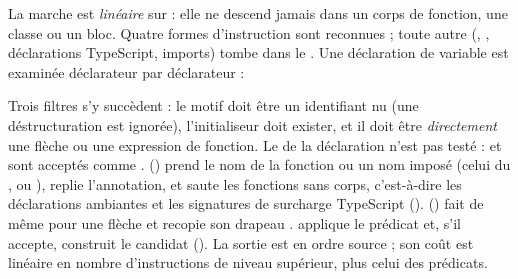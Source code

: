 
La marche est \emph{linéaire} sur  : elle ne descend jamais dans un corps de fonction, une classe ou un bloc. Quatre formes d'instruction sont reconnues ; toute autre (, , déclarations TypeScript, imports) tombe dans le \code{_ => {}}. Une déclaration de variable est examinée déclarateur par déclarateur :


Trois filtres s'y succèdent : le motif doit être un identifiant nu (une déstructuration  est ignorée), l'initialiseur doit exister, et il doit être \emph{directement} une flèche ou une expression de fonction. Le  de la déclaration n'est pas testé :  et  sont acceptés comme .  () prend le nom de la fonction ou un nom imposé (celui du , ou ), replie l'annotation, et saute les fonctions sans corps, c'est-à-dire les déclarations ambiantes et les signatures de surcharge TypeScript ().  () fait de même pour une flèche et recopie son drapeau .  applique le prédicat et, s'il accepte, construit le candidat (). La sortie est en ordre source ; son coût est linéaire en nombre d'instructions de niveau supérieur, plus celui des prédicats.

